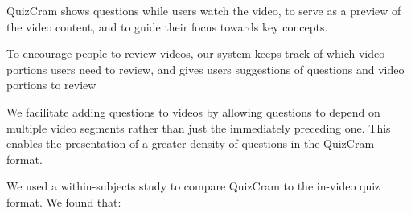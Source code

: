 \documentclass{chi-ext}
\begin{document}
\begin{compactitem}
\item QuizCram shows questions while users watch the video, to serve as a preview of the video content, and to guide their focus towards key concepts.
\item To encourage people to review videos, our system keeps track of which video portions users need to review, and gives users suggestions of questions and video portions to review %
\item We facilitate adding questions to videos by allowing questions to depend on multiple video segments rather than just the immediately preceding one. This enables the presentation of a greater density of questions in the QuizCram format.
\end{compactitem}

We used a within-subjects study to compare QuizCram to the in-video quiz format. We found that:

\end{document}
